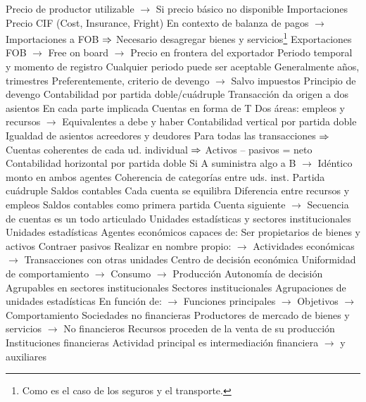 \documentclass{nuevotema}
\begin{document}
\begin{esquemal}
				\4[] Precio de productor utilizable
				\4[] $\to$ Si precio básico no disponible
				\4 Importaciones
				\4[] Precio CIF (Cost, Insurance, Fright)
				\4[] En contexto de balanza de pagos
				\4[] $\to$ Importaciones a FOB
				\4[] $\then$ Necesario desagregar bienes y servicios\footnote{Como es el caso de los seguros y el transporte.}
				\4 Exportaciones
				\4[] FOB
				\4[] $\to$ Free on board
				\4[] $\to$ Precio en frontera del exportador
			\3 Periodo temporal y momento de registro
				\4 Cualquier periodo puede ser aceptable
				\4 Generalmente años, trimestres
				\4 Preferentemente, criterio de devengo
				\4[] $\to$ Salvo impuestos
				\4 Principio de devengo
			\3 Contabilidad por partida doble/cuádruple
				\4 Transacción da origen a dos asientos
				\4[] En cada parte implicada
				\4 Cuentas en forma de T
				\4[] Dos áreas: empleos y recursos
				\4[] $\to$ Equivalentes a debe y haber
				\4 Contabilidad vertical por partida doble
				\4[] Igualdad de asientos acreedores y deudores
				\4[] Para todas las transacciones
				\4[] $\then$ Cuentas coherentes de cada ud. individual
				\4[] $\then$ Activos -- pasivos =  neto
				\4 Contabilidad horizontal por partida doble
				\4[] Si A suministra algo a B
				\4[] $\to$ Idéntico monto en ambos agentes
				\4[] Coherencia de categorías entre uds. inst.
				\4[$\then$] Partida cuádruple
			\3 Saldos contables
				\4 Cada cuenta se equilibra
				\4[] Diferencia entre recursos y empleos
				\4 Saldos contables como primera partida
				\4[] Cuenta siguiente
				\4[] $\to$ Secuencia de cuentas es un todo articulado
		\2 Unidades estadísticas y sectores institucionales
			\3 Unidades estadísticas
				\4 Agentes económicos capaces de:
				\4[] Ser propietarios de bienes y activos
				\4[] Contraer pasivos
				\4[] Realizar en nombre propio:
				\4[] $\to$ Actividades económicas
				\4[] $\to$ Transacciones con otras unidades
				\4 Centro de decisión económica
				\4[] Uniformidad de comportamiento
				\4[] $\to$ Consumo
				\4[] $\to$ Producción
				\4[] Autonomía de decisión
				\4 Agrupables en sectores institucionales
			\3 Sectores institucionales
				\4 Agrupaciones de unidades estadísticas
				\4[] En función de:
				\4[] $\to$ Funciones principales
				\4[] $\to$ Objetivos
				\4[] $\to$ Comportamiento
				\4[S.11] Sociedades no financieras
				\4[] Productores de mercado de bienes y servicios
				\4[] $\to$ No financieros
				\4[] Recursos proceden de la venta de su producción
				\4[S.12] Instituciones financieras
				\4[] Actividad principal es intermediación financiera
				\4[] $\to$ y auxiliares

\end{esquemal}
\end{document}
